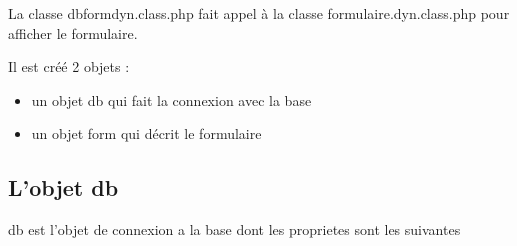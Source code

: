 \documentclass[letterpaper,10pt,french]{manual}
\begin{document}
La classe dbformdyn.class.php fait appel à la classe formulaire.dyn.class.php pour afficher le formulaire.

Il est créé 2 objets :
\begin{itemize}
\item {} 
un objet db qui fait la connexion avec la base

\item {} 
un objet form qui décrit le formulaire

\end{itemize}


\subsection{L'objet db}

db est l'objet de connexion a la base dont les proprietes sont les suivantes
\end{document}
